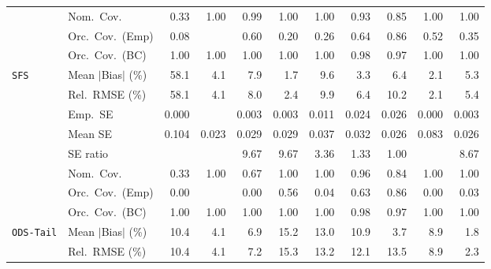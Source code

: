 \begin{landscape}
\begin{longtable}{llrrrrrrrrr}
 & Nom.\ Cov. & 0.33 & \cellcolor{rankthree}1.00 & \cellcolor{ranktwo}0.99 & \cellcolor{rankthree}1.00 & \cellcolor{rankthree}1.00 & \cellcolor{rankone}0.93 & 0.85 & \cellcolor{rankthree}1.00 & \cellcolor{rankthree}1.00 \\
 & Orc.\ Cov.\ (Emp) & 0.08 &  & \cellcolor{rankthree}0.60 & 0.20 & 0.26 & \cellcolor{ranktwo}0.64 & \cellcolor{rankone}0.86 & 0.52 & 0.35 \\
 & Orc.\ Cov.\ (BC) & \cellcolor{rankthree}1.00 & \cellcolor{rankthree}1.00 & \cellcolor{rankthree}1.00 & \cellcolor{rankthree}1.00 & \cellcolor{rankthree}1.00 & \cellcolor{ranktwo}0.98 & \cellcolor{rankone}0.97 & \cellcolor{rankthree}1.00 & \cellcolor{rankthree}1.00 \\
\addlinespace[2pt]
\quad \texttt{SFS} & Mean $|$Bias$|$ (\%) & 58.1 & 4.1 & 7.9 & \cellcolor{rankone}1.7 & 9.6 & \cellcolor{rankthree}3.3 & 6.4 & \cellcolor{ranktwo}2.1 & 5.3 \\
 & Rel.\ RMSE (\%) & 58.1 & \cellcolor{rankthree}4.1 & 8.0 & \cellcolor{ranktwo}2.4 & 9.9 & 6.4 & 10.2 & \cellcolor{rankone}2.1 & 5.4 \\
 & Emp.\ SE & 0.000 &  & 0.003 & 0.003 & 0.011 & 0.024 & 0.026 & 0.000 & 0.003 \\
 & Mean SE & 0.104 & 0.023 & 0.029 & 0.029 & 0.037 & 0.032 & 0.026 & 0.083 & 0.026 \\
 & SE ratio &  &  & 9.67 & 9.67 & \cellcolor{rankthree}3.36 & \cellcolor{ranktwo}1.33 & \cellcolor{rankone}1.00 &  & 8.67 \\
 & Nom.\ Cov. & 0.33 & \cellcolor{ranktwo}1.00 & 0.67 & \cellcolor{ranktwo}1.00 & \cellcolor{ranktwo}1.00 & \cellcolor{rankone}0.96 & \cellcolor{rankthree}0.84 & \cellcolor{ranktwo}1.00 & \cellcolor{ranktwo}1.00 \\
 & Orc.\ Cov.\ (Emp) & 0.00 &  & 0.00 & \cellcolor{rankthree}0.56 & 0.04 & \cellcolor{ranktwo}0.63 & \cellcolor{rankone}0.86 & 0.00 & 0.03 \\
 & Orc.\ Cov.\ (BC) & \cellcolor{rankthree}1.00 & \cellcolor{rankthree}1.00 & \cellcolor{rankthree}1.00 & \cellcolor{rankthree}1.00 & \cellcolor{rankthree}1.00 & \cellcolor{ranktwo}0.98 & \cellcolor{rankone}0.97 & \cellcolor{rankthree}1.00 & \cellcolor{rankthree}1.00 \\
\addlinespace[2pt]
\quad \texttt{ODS-Tail} & Mean $|$Bias$|$ (\%) & 10.4 & \cellcolor{rankthree}4.1 & 6.9 & 15.2 & 13.0 & 10.9 & \cellcolor{ranktwo}3.7 & 8.9 & \cellcolor{rankone}1.8 \\
 & Rel.\ RMSE (\%) & 10.4 & \cellcolor{ranktwo}4.1 & \cellcolor{rankthree}7.2 & 15.3 & 13.2 & 12.1 & 13.5 & 8.9 & \cellcolor{rankone}2.3 \\

\end{longtable}
\end{landscape}
